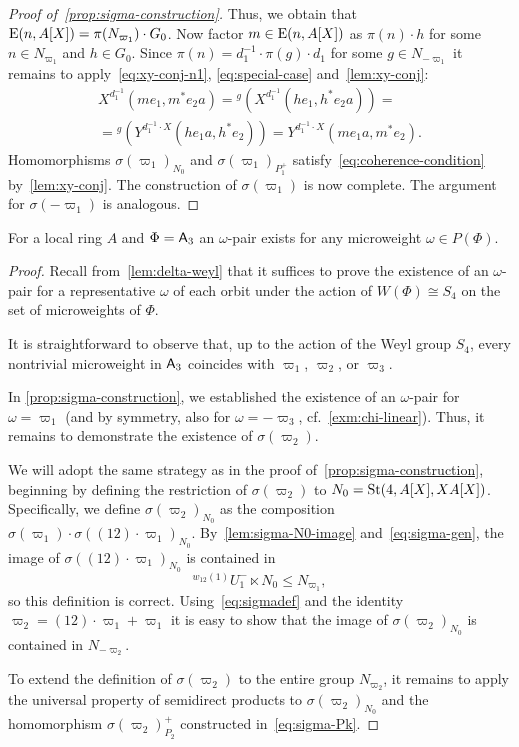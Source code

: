 \begin{proof}[Proof of~\cref{prop:sigma-construction}]
    Thus, we obtain that $\operatorname{E}(n, A[X]) = \pi(N_{\varpi_1}) \cdot G_0$.
    Now factor $m \in \operatorname{E}(n, A[X])$ as $\pi(n) \cdot h$ for some $n\in N_{\varpi_1}$ and $h \in G_0$.
    Since $\pi(n) = d_1^{-1} \cdot \pi(g) \cdot d_1$ for some $g \in N_{-\varpi_1}$ it remains to apply~\eqref{eq:xy-conj-n1}, \eqref{eq:special-case} and~\cref{lem:xy-conj}:
    \begin{multline}
        \nonumber X^{d_1^{-1}}(me_1, m^*e_{2}a) = {}^{g}(X^{d_1^{-1}}(he_1, h^*e_{2}a)) = \\
        = {}^{g}(Y^{d_1^{-1} \cdot X}(he_{1}a, h^*e_2)) = Y^{d_1^{-1} \cdot X}(me_{1}a, m^{*} e_{2}).
    \end{multline}
    Homomorphisms $\sigma(\varpi_1)_{N_0}$ and $\sigma(\varpi_1)_{P_1^+}$ satisfy~\eqref{eq:coherence-condition} by~\cref{lem:xy-conj}.
    The construction of $\sigma(\varpi_1)$ is now complete.
    The argument for $\sigma(-\varpi_1)$ is analogous.
\end{proof}

\begin{cor} \label{cor:a3-microweight}
    For a local ring $A$ and $\Phi = \mathsf{A}_3$ an $\omega$-pair exists for any microweight $\omega \in P(\Phi)$.
\end{cor}
\begin{proof}
    Recall from~\cref{lem:delta-weyl} that it suffices to prove the existence of an $\omega$-pair for a representative $\omega$
    of each orbit under the action of $W(\Phi) \cong S_4$ on the set of microweights of $\Phi$.

    It is straightforward to observe that, up to the action of the Weyl group $S_4$, every nontrivial microweight in $\mathsf{A}_3$ coincides with
    $\varpi_1$, $\varpi_2$, or $\varpi_3$.

    In \cref{prop:sigma-construction}, we established the existence of an $\omega$-pair for $\omega = \varpi_1$
    (and by symmetry, also for $\omega = -\varpi_3$, cf.~\cref{exm:chi-linear}). Thus, it remains to demonstrate the existence of $\sigma(\varpi_2)$.

    We will adopt the same strategy as in the proof of~\cref{prop:sigma-construction}, beginning by defining the restriction of $\sigma(\varpi_2)$ to $N_0 = \operatorname{St}(4, A[X], XA[X])$.
    Specifically, we define $\sigma(\varpi_2)_{N_0}$ as the composition
    $\sigma(\varpi_1) \cdot \sigma((12) \cdot \varpi_1)_{N_0}$.
    By~\cref{lem:sigma-N0-image} and~\eqref{eq:sigma-gen}, the image of $\sigma((12) \cdot \varpi_1)_{N_0}$ is contained in
    \[{}^{w_{12}(1)}U_1^- \ltimes N_0 \leq N_{\varpi_1},\] so this definition is correct.
    Using~\eqref{eq:sigmadef} and the identity
    $\varpi_2 = (12) \cdot \varpi_1 + \varpi_1$ it is easy to show that the image of $\sigma(\varpi_2)_{N_0}$ is contained in $N_{-\varpi_2}$.

    To extend the definition of $\sigma(\varpi_2)$ to the entire group $N_{\varpi_2}$, it remains to apply the universal property of semidirect products to
    $\sigma(\varpi_2)_{N_0}$ and the homomorphism $\sigma(\varpi_2)_{P_2}^+$ constructed in~\eqref{eq:sigma-Pk}.
\end{proof}

